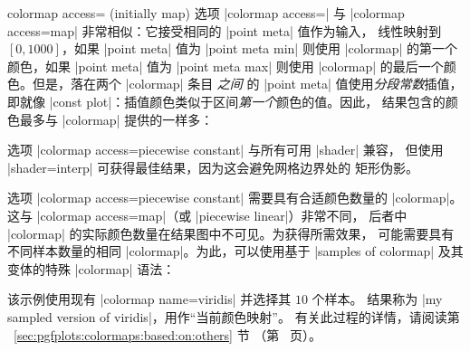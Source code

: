 \begin{pgfplotskey}{colormap access= (initially map)%
}
    选项 |colormap access=| 与
    |colormap access=map| 非常相似：它接受相同的 |point meta| 值作为输入，
    线性映射到 $[0,1000]$，如果 |point meta| 值为 |point meta min| 则使用
    |colormap| 的第一个颜色，如果 |point meta| 值为 |point meta max|
    则使用 |colormap| 的最后一个颜色。但是，落在两个 |colormap| 条目
    \emph{之间} 的 |point meta| 值使用\emph{分段常数}插值，即就像
    |const plot|：插值颜色类似于区间\emph{第一个}颜色的值。因此，
    结果包含的颜色最多与 |colormap| 提供的一样多：
\begin{codeexample}[]
\end{codeexample}
    选项 |colormap access=piecewise constant| 与所有可用 |shader| 兼容，
    但使用 |shader=interp| 可获得最佳结果，因为这会避免网格边界处的
    矩形伪影。
\begin{codeexample}[]
\end{codeexample}

    选项 |colormap access=piecewise constant| 需要具有合适颜色数量的
    |colormap|。这与 |colormap access=map|（或 |piecewise linear|）非常不同，
    后者中 |colormap| 的实际颜色数量在结果图中不可见。为获得所需效果，
    可能需要具有不同样本数量的相同 |colormap|。为此，可以使用基于
    |samples of colormap| 及其变体的特殊 |colormap| 语法：

\begin{codeexample}[]
\end{codeexample}
    该示例使用现有 |colormap name=viridis| 并选择其 $10$ 个样本。
    结果称为 |my sampled version of viridis|，用作``当前颜色映射''。
    有关此过程的详情，请阅读第
    ~\ref{sec:pgfplots:colormaps:based:on:others} 节
    （第~\pageref{sec:pgfplots:colormaps:based:on:others} 页）。



\end{pgfplotskey}

